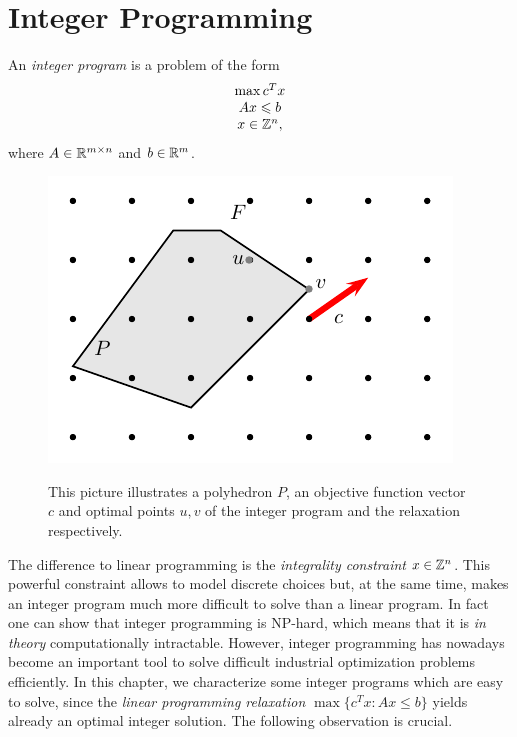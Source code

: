 \chapter{Integer Programming}
\label{sec:integer-programming}

An \emph{integer program} is a problem of the form 
\begin{displaymath}
  \begin{array}{c}
    \max c^Tx \\
    Ax\leqslant b \\
    x \in \mathbb{Z}^n,
  \end{array}
\end{displaymath}
where $A \in \mathbb{R}^{m\times n}$ and $b \in \mathbb{R}^m$. 




\begin{figure}[htbp]
  \begin{center}
   \includegraphics{./figures/IntProg1.pdf}
\label{fig:inthull}
  \end{center}
  \caption{This picture illustrates a polyhedron $P$, an objective
    function vector $c$ and optimal points $u,v$ of the integer
    program and the relaxation respectively. }
\end{figure}



The difference to linear programming is the \emph{integrality
  constraint} $x \in \mathbb{Z}^n$. This powerful constraint allows to
model discrete choices but, at the same time, makes an integer program
much more difficult to solve than a linear program. In fact one can
show that integer programming is NP-hard, which means that it is
\emph{in theory} computationally intractable. However, integer
programming has nowadays become an important tool to solve difficult
industrial optimization problems efficiently. In this chapter, we
characterize some integer programs which are easy to solve, since the
\emph{linear programming relaxation} $\max\{c^Tx \colon Ax\leq b\}$
yields already an optimal integer solution. The following observation
is crucial.

